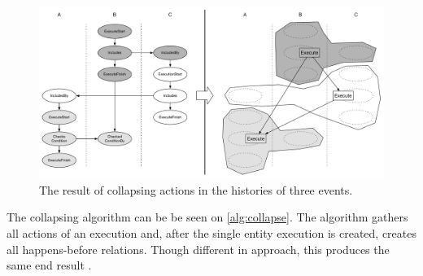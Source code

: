 	\begin{figure}[H]
		\centering
		\includegraphics[width=\textwidth]{6orderofexecution/images/transitive-example-collapse.pdf}
		\caption{The result of collapsing actions in the histories of three events.}
		\label{fig:orderofexecution:collapsing}
	\end{figure}
	
%	
%	
	
	\newpar The collapsing algorithm can be be seen on \autoref{alg:collapse}. The algorithm gathers all actions of an execution and, after the single entity execution is created, creates all happens-before relations. Though different in approach, this produces the same end result .
	
